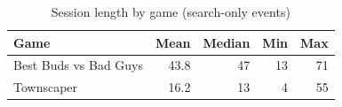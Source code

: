 \begin{table}[t]
\centering
\caption{Session length by game (search-only events)}
\label{tab:rq1-session-length}
\begin{tabular}{lrrrr}
\toprule
Game & Mean & Median & Min & Max \\
\midrule
Best Buds vs Bad Guys & 43.8 & 47 & 13 & 71 \\
Townscaper & 16.2 & 13 & 4 & 55 \\
\bottomrule
\end{tabular}
\end{table}

